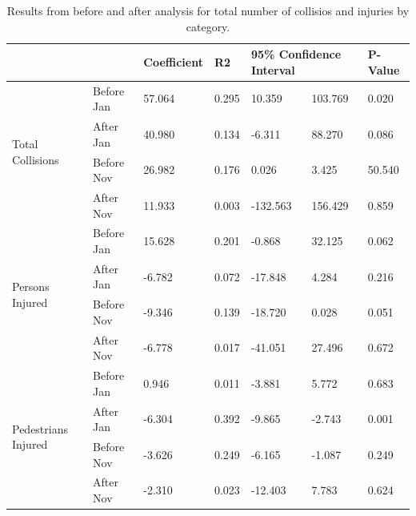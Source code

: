 \documentclass[10pt,journal,compsoc]{IEEEtran}
\begin{document}
\begin{table}[]
\centering
\caption{Results from before and after analysis for total number of collisios and injuries by category.}
\label{tab:ana}
\begin{tabular}{|l|l|l|l|l|l|l|}
\hline
                                     &            & Coefficient & R2    & \multicolumn{2}{l|}{95\% Confidence Interval} & P-Value \\ \hline
\multirow{4}{*}{Total Collisions}    & Before Jan & 57.064      & 0.295 & 10.359                 & 103.769              & 0.020   \\ \cline{2-7} 
                                     & After Jan  & 40.980      & 0.134 & -6.311                 & 88.270               & 0.086   \\ \cline{2-7} 
                                     & Before Nov & 26.982      & 0.176 & 0.026                  & 3.425                & 50.540  \\ \cline{2-7} 
                                     & After Nov  & 11.933      & 0.003 & -132.563               & 156.429              & 0.859   \\ \hline
\multirow{4}{*}{Persons Injured}     & Before Jan & 15.628      & 0.201 & -0.868                 & 32.125               & 0.062   \\ \cline{2-7} 
                                     & After Jan  & -6.782      & 0.072 & -17.848                & 4.284                & 0.216   \\ \cline{2-7} 
                                     & Before Nov & -9.346      & 0.139 & -18.720                & 0.028                & 0.051   \\ \cline{2-7} 
                                     & After Nov  & -6.778      & 0.017 & -41.051                & 27.496               & 0.672   \\ \hline
\multirow{4}{*}{Pedestrians Injured} & Before Jan & 0.946       & 0.011 & -3.881                 & 5.772                & 0.683   \\ \cline{2-7} 
                                     & After Jan  & -6.304      & 0.392 & -9.865                 & -2.743               & 0.001   \\ \cline{2-7} 
                                     & Before Nov & -3.626      & 0.249 & -6.165                 & -1.087               & 0.249   \\ \cline{2-7} 
                                     & After Nov  & -2.310      & 0.023 & -12.403                & 7.783                & 0.624   \\ \hline

\end{tabular}
\end{table}
\end{document}
